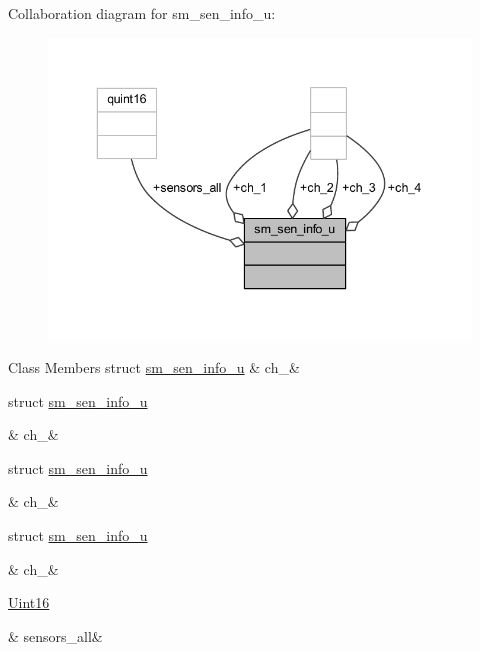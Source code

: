 Collaboration diagram for sm\+\_\+sen\+\_\+info\+\_\+u\+:
\nopagebreak
\begin{figure}[H]
\begin{center}
\leavevmode
\includegraphics[width=343pt]{da/d31/a00234}
\end{center}
\end{figure}
\begin{DoxyFields}{Class Members}
\hypertarget{a00001_a45d77cdf7e0102646d89cf73a07bb22c}{struct \hyperlink{a00001_d9/d47/a00129}{sm\+\_\+sen\+\_\+info\+\_\+u}}\label{a00001_a45d77cdf7e0102646d89cf73a07bb22c}
&
ch\+\_&
\\
\hline

\hypertarget{a00001_a53a5f39c10b44f2507848faec0fe4f61}{struct \hyperlink{a00001_d6/db3/a00130}{sm\+\_\+sen\+\_\+info\+\_\+u}}\label{a00001_a53a5f39c10b44f2507848faec0fe4f61}
&
ch\+\_&
\\
\hline

\hypertarget{a00001_aef82d4a79d1fe9dd39cef1242d3c9023}{struct \hyperlink{a00001_d7/d06/a00131}{sm\+\_\+sen\+\_\+info\+\_\+u}}\label{a00001_aef82d4a79d1fe9dd39cef1242d3c9023}
&
ch\+\_&
\\
\hline

\hypertarget{a00001_a02949a0e5304d0b23efb36a7c64246ca}{struct \hyperlink{a00001_d5/deb/a00132}{sm\+\_\+sen\+\_\+info\+\_\+u}}\label{a00001_a02949a0e5304d0b23efb36a7c64246ca}
&
ch\+\_&
\\
\hline

\hypertarget{a00001_a279a155591a7a00f1e0f9b3b061eebd7}{\hyperlink{a00001_aae7407b021d43f7193a81a58cfb3e297}{Uint16}}\label{a00001_a279a155591a7a00f1e0f9b3b061eebd7}
&
sensors\+\_\+all&
\\
\hline

\end{DoxyFields}
\label{d9/d73/a00060}
\hypertarget{a00001_d9/d73/a00060}{}
